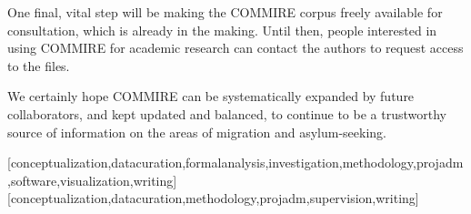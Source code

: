 \documentclass[english]{textolivre}
\begin{document}
One final, vital step will be making the COMMIRE corpus freely available for consultation, which is already in the making. Until then, people interested in using COMMIRE for academic research can contact the authors to request access to the files.

We certainly hope COMMIRE can be systematically expanded by future collaborators, and kept updated and balanced, to continue to be a trustworthy source of information on the areas of migration and asylum-seeking.



\printbibliography\label{sec-bib}


\begin{contributors}
[conceptualization,datacuration,formalanalysis,investigation,methodology,projadm,software,visualization,writing]
[conceptualization,datacuration,methodology,projadm,supervision,writing]
\end{contributors}
\end{document}

